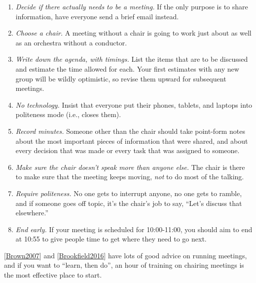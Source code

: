\documentclass[10pt,statementpaper]{memoir}
\begin{document}
\begin{enumerate}
\def\labelenumi{\arabic{enumi}.}
\item
  \emph{Decide if there actually needs to be a meeting.} If the only
  purpose is to share information, have everyone send a brief email
  instead.
\item
  \emph{Choose a chair.} A meeting without a chair is going to work just
  about as well as an orchestra without a conductor.
\item
  \emph{Write down the agenda, with timings.} List the items that are to
  be discussed and estimate the time allowed for each. Your first
  estimates with any new group will be wildly optimistic, so revise them
  upward for subsequent meetings.
\item
  \emph{No technology.} Insist that everyone put their phones, tablets,
  and laptops into politeness mode (i.e., closes them).
\item
  \emph{Record minutes.} Someone other than the chair should take
  point-form notes about the most important pieces of information that
  were shared, and about every decision that was made or every task that
  was assigned to someone.
\item
  \emph{Make sure the chair doesn't speak more than anyone else.} The
  chair is there to make sure that the meeting keeps moving, \emph{not}
  to do most of the talking.
\item
  \emph{Require politeness.} No one gets to interrupt anyone, no one
  gets to ramble, and if someone goes off topic, it's the chair's job to
  say, ``Let's discuss that elsewhere.''
\item
  \emph{End early.} If your meeting is scheduled for 10:00-11:00, you
  should aim to end at 10:55 to give people time to get where they need
  to go next.
\end{enumerate}

{[}\href{biblio.html\#brown-bpco}{Brown2007}{]} and
{[}\href{biblio.html\#brookfield-discussion}{Brookfield2016}{]} have
lots of good advice on running meetings, and if you want to ``learn,
then do'', an hour of training on chairing meetings is the most
effective place to start.
\end{document}

